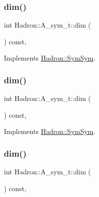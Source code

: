 \subsubsection{\texorpdfstring{dim()}{dim()}\hspace{0.1cm}{\footnotesize\ttfamily [3/5]}}
{\footnotesize\ttfamily int Hadron\+::\+A\+\_\+sym\+\_\+t\+::dim (\begin{DoxyParamCaption}{ }\end{DoxyParamCaption}) const\hspace{0.3cm}{\ttfamily [inline]}, {\ttfamily [virtual]}}



Implements \mbox{\hyperlink{structHadron_1_1SymSym_ae57780f41b9f6c03c6056eed3677bd48}{Hadron\+::\+Sym\+Sym}}.

\mbox{\label{structHadron_1_1A__sym__t_a57e9460ee09050859f969d1f0cae0e92}} 
\subsubsection{\texorpdfstring{dim()}{dim()}\hspace{0.1cm}{\footnotesize\ttfamily [4/5]}}
{\footnotesize\ttfamily int Hadron\+::\+A\+\_\+sym\+\_\+t\+::dim (\begin{DoxyParamCaption}{ }\end{DoxyParamCaption}) const\hspace{0.3cm}{\ttfamily [inline]}, {\ttfamily [virtual]}}



Implements \mbox{\hyperlink{structHadron_1_1SymSym_ae57780f41b9f6c03c6056eed3677bd48}{Hadron\+::\+Sym\+Sym}}.

\mbox{\label{structHadron_1_1A__sym__t_a57e9460ee09050859f969d1f0cae0e92}} 
\subsubsection{\texorpdfstring{dim()}{dim()}\hspace{0.1cm}{\footnotesize\ttfamily [5/5]}}
{\footnotesize\ttfamily int Hadron\+::\+A\+\_\+sym\+\_\+t\+::dim (\begin{DoxyParamCaption}{ }\end{DoxyParamCaption}) const\hspace{0.3cm}{\ttfamily [inline]}, {\ttfamily [virtual]}}



